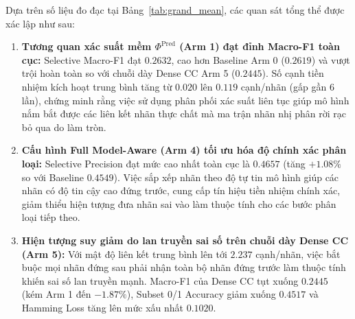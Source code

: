 \documentclass[11pt,a4paper]{article}
\begin{document}
\begin{table}[htbp]
\centering
\caption{\textbf{Hiệu năng vĩ mô toàn cầu trên tập phụ thuộc $DL$ qua 6 nhánh thực nghiệm (Grand Mean trên 30 thực nghiệm).}}
\label{tab:grand_mean}
\end{table}

Dựa trên số liệu đo đạc tại Bảng~\ref{tab:grand_mean}, các quan sát tổng thể được xác lập như sau:
\begin{enumerate}[leftmargin=*]
  \item \textbf{Tương quan xác suất mềm $\Phi^{\text{Pred}}$ (Arm 1) đạt đỉnh Macro-F1 toàn cục:} Selective Macro-F1 đạt $0.2632$, cao hơn Baseline Arm 0 ($0.2619$) và vượt trội hoàn toàn so với chuỗi dày Dense CC Arm 5 ($0.2445$). Số cạnh tiền nhiệm kích hoạt trung bình tăng từ $0.020$ lên $0.119$ cạnh/nhãn (gấp gần 6 lần), chứng minh rằng việc sử dụng phân phối xác suất liên tục giúp mô hình nắm bắt được các liên kết nhãn thực chất mà ma trận nhãn nhị phân rời rạc bỏ qua do làm tròn.
  \item \textbf{Cấu hình Full Model-Aware (Arm 4) tối ưu hóa độ chính xác phân loại:} Selective Precision đạt mức cao nhất toàn cục là $0.4657$ (tăng $+1.08\%$ so với Baseline $0.4549$). Việc sắp xếp nhãn theo độ tự tin mô hình giúp các nhãn có độ tin cậy cao đứng trước, cung cấp tín hiệu tiền nhiệm chính xác, giảm thiểu hiện tượng đưa nhãn sai vào làm thuộc tính cho các bước phân loại tiếp theo.
  \item \textbf{Hiện tượng suy giảm do lan truyền sai số trên chuỗi dày Dense CC (Arm 5):} Với mật độ liên kết trung bình lên tới $2.237$ cạnh/nhãn, việc bắt buộc mọi nhãn đứng sau phải nhận toàn bộ nhãn đứng trước làm thuộc tính khiến sai số lan truyền mạnh. Macro-F1 của Dense CC tụt xuống $0.2445$ (kém Arm 1 đến $-1.87\%$), Subset 0/1 Accuracy giảm xuống $0.4517$ và Hamming Loss tăng lên mức xấu nhất $0.1020$.
\end{enumerate}
\end{document}
